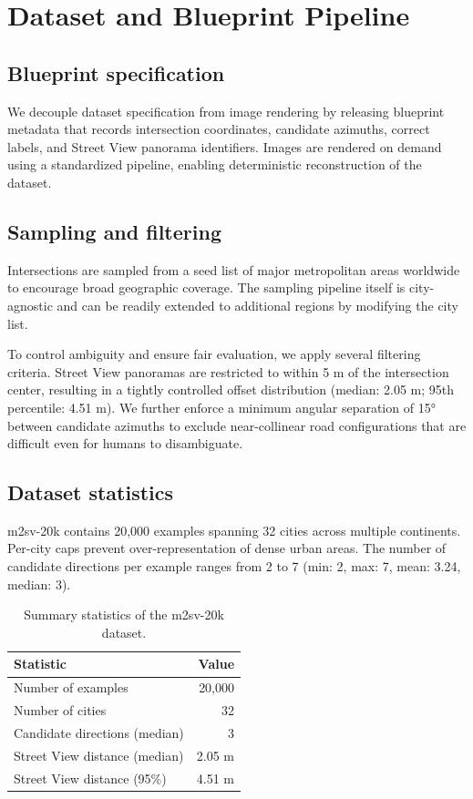 \documentclass{article}
\begin{document}
\section{Dataset and Blueprint Pipeline}

\subsection{Blueprint specification}

We decouple dataset specification from image rendering by releasing blueprint
metadata that records intersection coordinates, candidate azimuths, correct
labels, and Street View panorama identifiers. Images are rendered on demand using
a standardized pipeline, enabling deterministic reconstruction of the dataset.

\subsection{Sampling and filtering}

Intersections are sampled from a seed list of major metropolitan areas worldwide
to encourage broad geographic coverage. The sampling pipeline itself is
city-agnostic and can be readily extended to additional regions by modifying the
city list.

To control ambiguity and ensure fair evaluation, we apply several filtering
criteria. Street View panoramas are restricted to within 5 m of the intersection
center, resulting in a tightly controlled offset distribution (median: 2.05 m;
95th percentile: 4.51 m). We further enforce a minimum angular separation of 15°
between candidate azimuths to exclude near-collinear road configurations that are
difficult even for humans to disambiguate.

\subsection{Dataset statistics}

m2sv-20k contains 20,000 examples spanning 32 cities across multiple continents.
Per-city caps prevent over-representation of dense urban areas. The number of
candidate directions per example ranges from 2 to 7 (min: 2, max: 7, mean: 3.24,
median: 3).

\begin{table}[t]
  \centering
  \caption{Summary statistics of the m2sv-20k dataset.}
  \label{tab:dataset-stats}
  \begin{tabular}{l r}
    \toprule
    Statistic & Value \\
    \midrule
    Number of examples & 20,000 \\
    Number of cities & 32 \\
    Candidate directions (median) & 3 \\
    Street View distance (median) & 2.05 m \\
    Street View distance (95\%) & 4.51 m \\
    \bottomrule
  \end{tabular}
\end{table}
\end{document}
